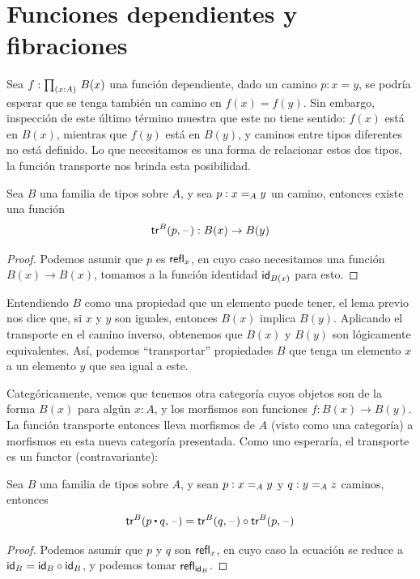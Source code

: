 \documentclass[../main.tex]{subfiles}
\begin{document}
\section{Funciones dependientes y fibraciones}
Sea $f:\dprd{x:A}B(x)$ una función dependiente, dado un camino $p:x=y$, se podr\'ia esperar que se tenga también un camino en $f(x)=f(y)$.
Sin embargo, inspecci\'on de este \'ultimo t\'ermino muestra que este no tiene sentido: $f(x)$ est\'a en $B(x)$, mientras que $f(y)$ est\'a en $B(y)$, y caminos entre tipos diferentes no est\'a definido.
Lo que necesitamos es una forma de relacionar estos dos tipos, la función transporte nos brinda esta posibilidad.

\begin{lemma}[Transporte]
  Sea $B$ una familia de tipos sobre $A$, y sea $p:\id[A]{x}{y}$ un camino, entonces existe una función
  $$\trfib{B}{p}{\blank} : B(x) \to B(y) $$
\end{lemma}
\begin{proof}
  Podemos asumir que $p$ es $\refl{x}$, en cuyo caso necesitamos una función $B(x) \to B(x)$, tomamos a la función identidad $\idfunc[B(x)]$ para esto.
\end{proof}

Entendiendo $B$ como una propiedad que un elemento puede tener, el lema previo nos dice que, si $x$ y $y$ son iguales, entonces $B(x)$ implica $B(y)$. Aplicando el transporte en el camino inverso, obtenemos que $B(x)$ y $B(y)$ son l\'ogicamente equivalentes. As\'i, podemos ``transportar'' propiedades $B$ que tenga un elemento $x$ a un elemento $y$ que sea igual a este.

Categ\'oricamente, vemos que tenemos otra categor\'ia cuyos objetos son de la forma $B(x)$ para alg\'un $x:A$, y los morfismos son funciones $f: B(x) \to B(y)$.
La función transporte entonces lleva morfismos de $A$ (visto como una categor\'ia) a morfismos en esta nueva categor\'ia presentada.
Como uno esperar\'ia, el transporte es un functor (contravariante):

\begin{lemma} \label{trfunctor}
  Sea $B$ una familia de tipos sobre $A$, y sean $p:\id[A]{x}{y}$ y $q:\id[A]{y}{z}$ caminos, entonces
  \[\trfib{B}{p \ct q}{\blank} = \trfib{B}{q}{\blank} \circ \trfib{B}{p}{\blank} \]
\end{lemma}
\begin{proof}
  Podemos asumir que $p$ y $q$ son $\refl{x}$, en cuyo caso la ecuaci\'on se reduce a $\idfunc[B]=\idfunc[B] \circ \idfunc[B]$, y podemos tomar $\refl{\idfunc[B]}$.
\end{proof}
\end{document}
